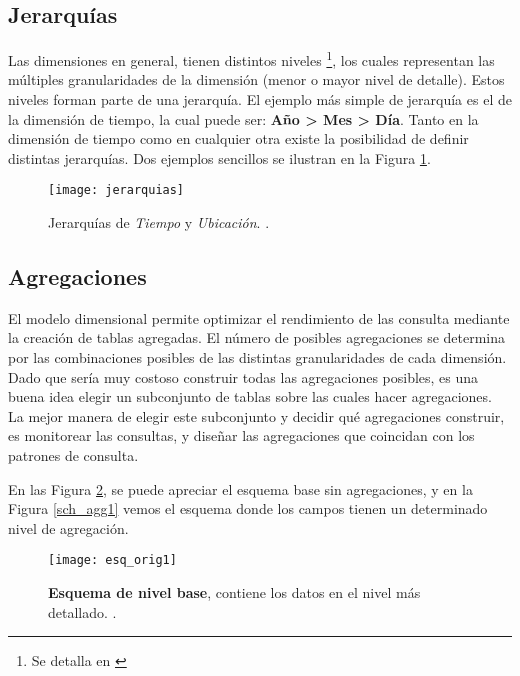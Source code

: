 \documentclass[a4paper,11pt]{article}
\begin{document}
    
    \subsection{Jerarquías}
    
    Las dimensiones en general, tienen distintos niveles \footnote{Se detalla en \cite[p.~94]{olap_solutions}}, los cuales representan las
    múltiples granularidades de la dimensión (menor o mayor nivel de detalle). Estos niveles forman parte de una jerarquía. El ejemplo más simple de
    jerarquía es el de la dimensión de tiempo, la cual puede ser: \textbf{Año > Mes > Día}. Tanto en la dimensión de
    tiempo como en cualquier otra existe la posibilidad de definir distintas jerarquías. Dos ejemplos sencillos se ilustran en la Figura
    \ref{jerarquias}.
    
    \begin{figure}
      \begin{center}
        \texttt{[image: jerarquias]}
        \caption{Jerarquías de \textit{Tiempo} y \textit{Ubicación}. \cite[p.~94]{olap_solutions}.}
        \label{jerarquias}
      \end{center}
    \end{figure}
    
    
    \subsection{Agregaciones}
    
    El modelo dimensional permite optimizar el rendimiento de las consulta mediante la creación de tablas agregadas. El número de posibles agregaciones se
    determina por las combinaciones posibles de las distintas granularidades de cada dimensión. Dado que sería muy costoso construir todas las agregaciones 
    posibles, es una buena idea elegir un subconjunto de tablas sobre las cuales hacer agregaciones. La mejor manera de elegir este subconjunto y decidir qué 
    agregaciones construir, es monitorear las consultas, y diseñar las agregaciones que coincidan con los patrones de consulta.\par
    
    En las Figura \ref{sch_orig1}, se puede apreciar el esquema base sin agregaciones, y en la Figura \ref{sch_agg1} vemos el esquema
    donde los campos tienen un determinado nivel de agregación.
    
    \begin{figure}
      \begin{center}
        \texttt{[image: esq\_orig1]}
        \caption{\textbf{Esquema de nivel base}, contiene los datos en el nivel más detallado. \cite[p.~172]{nagabhushana}.}
        \label{sch_orig1}
      \end{center}
    \end{figure}
    
\end{document}
